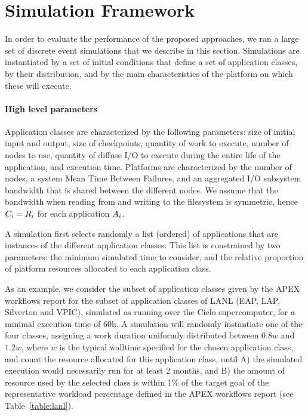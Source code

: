 
\section{Simulation Framework}
\label{sec:simulator}

In order to evaluate the performance of the proposed approaches, we ran
a large set of discrete event simulations that we describe in this
section. Simulations are instantiated by a set of initial conditions
that define a set of application classes, by their distribution, and by
the main characteristics of the platform on which these will execute.

\paragraph*{High level parameters}
Application classes are characterized by the following parameters:
size of initial input and output, size of checkpoints, quantity of
work to execute, number of nodes to use, quantity of diffuse I/O to
execute during the entire life of the application, and execution time.
Platforms are characterized by the number of nodes, a system Mean Time
Between Failures, and an aggregated I/O subsystem bandwidth that is
shared between the different nodes. We assume that the bandwidth when reading from and
writing to the filesystem is symmetric, hence $C_{i}=R_{i}$
for each application $A_{i}$.

A simulation first selects randomly a list (ordered) of applications
that are instances of the different application classes. This list is
constrained by two parameters: the minimum simulated time to consider,
and the relative proportion of platform resources allocated to each
application class.

As an example, we consider the subset of application classes given by
the APEX workflows report for the subset of application classes of
LANL (EAP, LAP, Silverton and VPIC), simulated as running over the
Cielo supercomputer, for a minimal execution time of 60h. A simulation
will randomly instantiate one of the four classes, assigning a work
duration uniformly distributed between $0.8w$ and $1.2w$, where $w$ is
the typical walltime specified for the chosen application class, and
count the resource allocated for this application class, until A) the
simulated execution would necessarily run for at least 2 months, and B) the
amount of resource used by the selected class is within 1\% of the
target goal of the representative workload percentage defined in the
APEX workflows report (see Table~\ref{table:lanl}).

